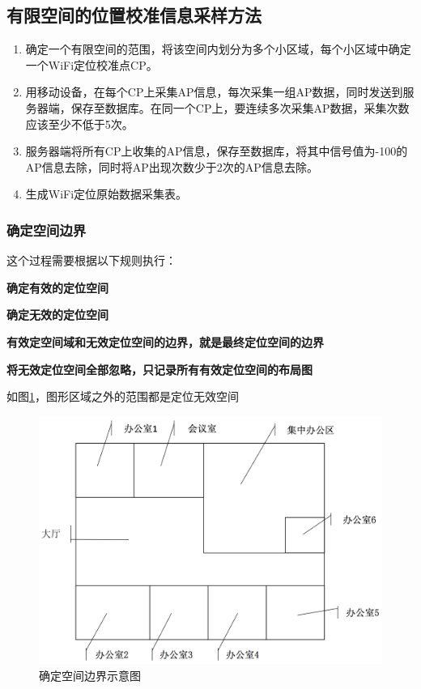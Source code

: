 \documentclass[UTF8, twocolumn ]{ctexart}
\begin{document}
\subsection{有限空间的位置校准信息采样方法}
\begin{enumerate}
\item 确定一个有限空间的范围，将该空间内划分为多个小区域，每个小区域中确定一个WiFi定位校准点CP。
\item 用移动设备，在每个CP上采集AP信息，每次采集一组AP数据，同时发送到服务器端，保存至数据库。在同一个CP上，要连续多次采集AP数据，采集次数应该至少不低于5次。
\item 服务器端将所有CP上收集的AP信息，保存至数据库，将其中信号值为-100的AP信息去除，同时将AP出现次数少于2次的AP信息去除。
\item 生成WiFi定位原始数据采集表。
\end{enumerate}

\subsubsection{确定空间边界}
这个过程需要根据以下规则执行：
\begin{compactitem}
\item\textbf{确定有效的定位空间}
\item\textbf{确定无效的定位空间}
\item\textbf{有效定空间域和无效定位空间的边界，就是最终定位空间的边界}
\item\textbf{将无效定位空间全部忽略，只记录所有有效定位空间的布局图}
\end{compactitem}
\par
如图\ref{fig:no2}，图形区域之外的范围都是定位无效空间
\begin{figure}[!ht]\centering
  \includegraphics[keepaspectratio, scale=0.2]{no2.png}
  \caption{确定空间边界示意图\label{fig:no2}} 
\end{figure}
\end{document}
